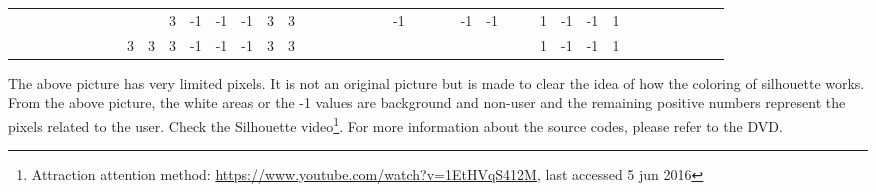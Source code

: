 \begin{table}[H]
{\begin{tabular}{ccccccccccccccccccccccccccccccccccccccccc}
   &    &                           &                           &                           &                           &                           &                           &                           &                           & \cellcolor[HTML]{3531FF}3 & -1                        & -1                        & -1                        & \cellcolor[HTML]{3531FF}3 & \cellcolor[HTML]{3531FF}3 &                           &                           &                           &                           &                           &                           & -1                        &    &    &    & -1                        & -1                        &                           &                           & \cellcolor[HTML]{329A9D}1 & -1                        & -1                        & \cellcolor[HTML]{329A9D}1 &                           &                           &                           &                           &  &  &  \\
   &    &                           &                           &                           &                           &                           &                           & \cellcolor[HTML]{3531FF}3 & \cellcolor[HTML]{3531FF}3 & \cellcolor[HTML]{3531FF}3 & -1                        & -1                        & -1                        & \cellcolor[HTML]{3531FF}3 & \cellcolor[HTML]{3531FF}3 &                           &                           &                           &                           &                           &                           &                           &    &    &    &                           &                           &                           &                           & \cellcolor[HTML]{329A9D}1 & -1                        & -1                        & \cellcolor[HTML]{329A9D}1 &                           &                           &                           &                           &  &  & 
\end{tabular}
}
\end{table}

The above picture has very limited pixels. It is not an original picture but is made to clear the idea of how the coloring of silhouette works. From the above picture, the white areas or the -1 values are background and non-user and the remaining positive numbers represent the pixels related to the user.
Check the Silhouette video\footnote{Attraction attention method: \url{https://www.youtube.com/watch?v=1EtHVqS412M}, last accessed 5 jun 2016}. For more information about the source codes, please refer to the DVD.



